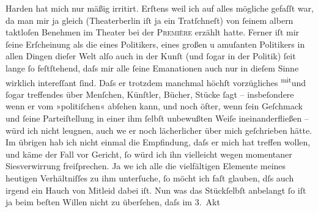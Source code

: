 \begin{ledgroupsized}[t]{13cm}
           \pstart
           {\pb}Harden hat mich nur mäßig irritirt. Erſtens
               weil ich auf alles mögliche gefaſſt war, da man mir ja gleich (Theaterberlin iſt ja ein Tratſchneſt) von ſeinem albern
               taktloſen Benehmen im Theater bei der \textsc{Première} erzählt hatte. Ferner iſt mir ſeine Erſcheinung als die eines Politikers, eines
               großen u amuſanten Politikers in allen Dingen dieſer Welt alſo auch in der Kunſt (und
               ſogar in der Politik) ſeit lange ſo feſtſtehend, {\pb}daſs
               mir alle ſeine Emanationen auch nur in dieſem Sinne wirklich intereſſant ſind. Daſs
               er trotzdem manchmal höchſt vorzügliches \substVorne{}\textsuperscript{mit}\substDazwischen{}und\substHinten{}{ } ſogar treffendes über Menſchen, Künſtler,
               Bücher, Stücke ſagt – insbeſondere wenn er vom »politiſchen« abſehen kann, und noch
               öfter, wenn ſein Geſchmack und ſeine Parteiſtellung in einer ihm ſelbſt unbewußten
               Weiſe ineinanderfließen – würd ich nicht leugnen, auch we{\geminationn} er noch lächerlicher über mich geſchrie{\pb}ben hätte. Im übrigen hab ich nicht
               einmal die Empfindung, daſs er mich hat treffen wollen, und käme der Fall vor
               Gericht, ſo würd ich ihn vielleicht wegen momentaner Si{\geminationn}esverwirrung freiſprechen. Ja we{\geminationn} ich alle die
               vielfältigen Elemente meines heutigen Verhältniſſes zu ihm unterſuche, ſo möcht ich
               faſt glauben, dſs auch irgend ein Hauch von Mitleid dabei iſt.\pend
           \pstart
           Nun was das Stückſelbſt anbelangt ſo iſt ja beim beſten Willen nicht
               zu überſehen, daſs im 3. Akt

\end{ledgroupsized}
